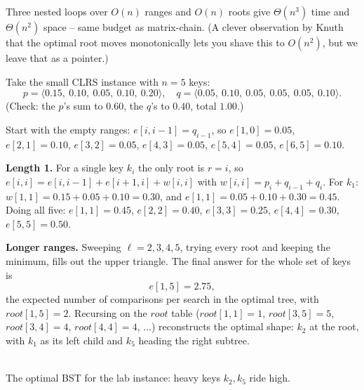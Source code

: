 Three nested loops over $O(n)$ ranges and $O(n)$ roots give $\Theta(n^3)$ time
and $\Theta(n^2)$ space -- same budget as matrix-chain. (A clever observation by
Knuth that the optimal root moves monotonically lets you shave this to
$O(n^2)$, but we leave that as a pointer.)

\begin{labbox}
Take the small CLRS instance with $n = 5$ keys:
\[
  p = \langle 0.15,\ 0.10,\ 0.05,\ 0.10,\ 0.20\rangle,\quad
  q = \langle 0.05,\ 0.10,\ 0.05,\ 0.05,\ 0.05,\ 0.10\rangle.
\]
(Check: the $p$'s sum to $0.60$, the $q$'s to $0.40$, total $1.00$.)

Start with the empty ranges: $e[i,i-1] = q_{i-1}$, so
$e[1,0]{=}0.05$, $e[2,1]{=}0.10$, $e[3,2]{=}0.05$, $e[4,3]{=}0.05$,
$e[5,4]{=}0.05$, $e[6,5]{=}0.10$.

\textbf{Length 1.} For a single key $k_i$ the only root is $r=i$, so
$e[i,i] = e[i,i-1] + e[i+1,i] + w[i,i]$ with $w[i,i] = p_i + q_{i-1} + q_i$.
For $k_1$: $w[1,1] = 0.15+0.05+0.10 = 0.30$, and
$e[1,1] = 0.05 + 0.10 + 0.30 = 0.45$. Doing all five:
$e[1,1]{=}0.45$, $e[2,2]{=}0.40$, $e[3,3]{=}0.25$, $e[4,4]{=}0.30$,
$e[5,5]{=}0.50$.

\textbf{Longer ranges.} Sweeping $\ell = 2,3,4,5$, trying every root and keeping
the minimum, fills out the upper triangle. The final answer for the whole set
of keys is
\[
  e[1,5] = 2.75,
\]
the expected number of comparisons per search in the optimal tree, with
$root[1,5] = 2$. Recursing on the $root$ table ($root[1,1]=1$, $root[3,5]=5$,
$root[3,4]=4$, $root[4,4]=4$, $\ldots$) reconstructs the optimal shape: $k_2$
at the root, with $k_1$ as its left child and $k_5$ heading the right subtree.
\end{labbox}

\begin{center}
\\[-1mm]
{\small The optimal BST for the lab instance: heavy keys $k_2,k_5$ ride high.}
\end{center}

